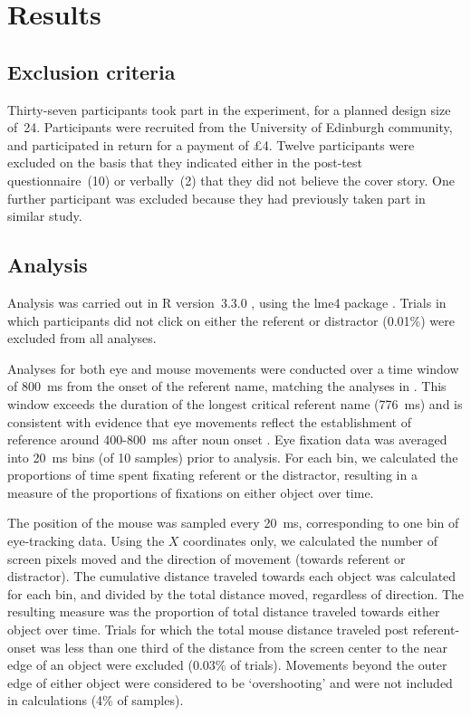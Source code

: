 \documentclass[a4paper,man,natbib]{apa6}
\begin{document}
\section{Results}
\subsection{Exclusion criteria}
Thirty-seven participants took part in the experiment, for a planned design size of~24.
Participants were recruited from the University of Edinburgh community, and participated in return for a payment of \pounds{}4.
Twelve participants were excluded on the basis that they indicated either in the post-test questionnaire~(10) or verbally~(2) that they did not believe the cover story.
One further participant was excluded because they had previously taken part in similar study.


\subsection{Analysis}
Analysis was carried out in R version~3.3.0 \citep{rbase}, using the lme4 package \citep{lme4}. 
Trials in which participants did not click on either the referent or distractor (0.01\%) were excluded from all analyses. 

Analyses for both eye and mouse movements were conducted over a time window of 800~ms from the onset of the referent name, matching the analyses in \citet{Loy2016}.
This window exceeds the duration of the longest critical referent name (776~ms) and is consistent with evidence that eye movements reflect the establishment of reference around 400-800~ms after noun onset \citep{Eberhard1995}.
Eye fixation data was averaged into 20~ms bins (of 10 samples) prior to analysis.
For each bin, we calculated the proportions of time spent fixating referent or the distractor, resulting in a measure of the proportions of fixations on either object over time.

The position of the mouse was sampled every 20~ms, corresponding to one bin of eye-tracking data.
Using the $X$ coordinates only, we calculated the number of screen pixels moved and the direction of movement (towards referent or distractor).
The cumulative distance traveled towards each object was calculated for each bin, and divided by the total distance moved, regardless of direction.
The resulting measure was the proportion of total distance traveled towards either object over time.
Trials for which the total mouse distance traveled post referent-onset was less than one third of the distance from the screen center to the near edge of an object were excluded (0.03\% of trials). 
Movements beyond the outer edge of either object were considered to be `overshooting' and were not included in calculations (4\% of samples).
\end{document}
